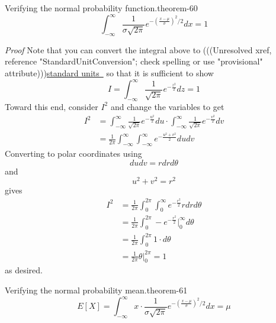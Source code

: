 \documentclass[10pt,]{book}
\makeatletter
\renewcommand*{\proofname}{Proof}
\renewenvironment{proof}[1][\proofname]{\par
  \pushQED{\qed}%
  \normalfont \topsep6\p@\@plus6\p@\relax
  \trivlist
  \item\relax
    {\itshape
    #1\@addpunct{.}}\hspace\labelsep\ignorespaces
}{%
  \popQED\endtrivlist\@endpefalse
}
\numberwithin{equation}{section}
\makeatother
\begin{document}
%
\par
\hypertarget{p-1182}{}%
\begin{theorem}{Verifying the normal probability function.}{}{theorem-60}%
\hypertarget{p-1183}{}%
%
\begin{equation*}
\int_{-\infty}^{\infty} \frac{1}{\sigma \sqrt{2 \pi}} e^{ -\left ( \frac{x-\mu}{\sigma} \right ) ^2 / 2} dx = 1
\end{equation*}
%
\end{theorem}
\begin{proof}\hypertarget{proof-62}{}
\hypertarget{p-1184}{}%
Note that you can convert the integral above to {(((Unresolved xref, reference "StandardUnitConversion"; check spelling or use "provisional" attribute)))}\hyperlink{}{standard units~} so that it is sufficient to show%
\begin{equation*}
I = \int_{-\infty}^{\infty} \frac{1}{\sqrt{2 \pi}} e^{ -\frac{z^2}{2} } dz = 1
\end{equation*}
Toward this end, consider \(I^2\) and change the variables to get%
\begin{align*}
I^2 & = \int_{-\infty}^{\infty} \frac{1}{\sqrt{2 \pi}} e^{ -\frac{u^2}{2} } du \cdot \int_{-\infty}^{\infty} \frac{1}{\sqrt{2 \pi}} e^{ -\frac{v^2}{2} } dv\\
& = \frac{1}{2 \pi} \int_{-\infty}^{\infty} \int_{-\infty}^{\infty} e^{ -\frac{u^2+v^2}{2} } du dv
\end{align*}
Converting to polar coordinates using%
\begin{equation*}
du dv = r dr d\theta 
\end{equation*}
and%
\begin{equation*}
u^2 + v^2 = r^2
\end{equation*}
gives%
\begin{align*}
I^2 & = \frac{1}{2 \pi} \int_0^{2 \pi} \int_0^{\infty} e^{ -\frac{r^2}{2} } r dr d\theta\\
& = \frac{1}{2 \pi} \int_0^{2 \pi} -e^{ -\frac{r^2}{2} } \big |_0^{\infty} d\theta\\
& = \frac{1}{2 \pi} \int_0^{2 \pi} 1 \cdot d\theta\\
& = \frac{1}{2 \pi} \theta \big |_0^{2 \pi} = 1
\end{align*}
as desired.%
\end{proof}
%
\par
\hypertarget{p-1185}{}%
\begin{theorem}{Verifying the normal probability mean.}{}{theorem-61}%
\hypertarget{p-1186}{}%
%
\begin{equation*}
E[X] = \int_{-\infty}^{\infty} x \cdot \frac{1}{\sigma \sqrt{2 \pi}} e^{ - \left ( \frac{x-\mu}{\sigma} \right ) ^2 / 2} dx = \mu
\end{equation*}
%
\end{theorem}
\end{document}
